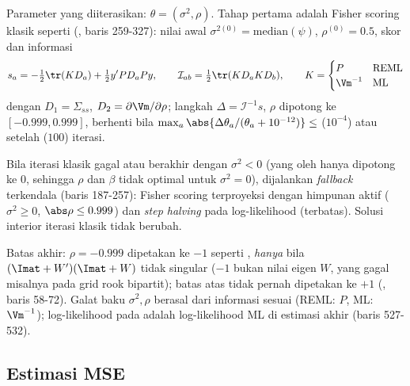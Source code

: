 Parameter yang diiterasikan: $\theta=(\sigma^2,\rho)$. Tahap pertama adalah
Fisher scoring klasik seperti  (,
baris 259-327): nilai awal $\sigma^{2(0)}=\mathrm{median}(\psi)$,
$\rho^{(0)}=0.5$, skor dan informasi
\begin{equation}
  s_a=-\tfrac12\tr(K D_a)+\tfrac12 y'P D_a P y,
  \qquad
  \mathcal I_{ab}=\tfrac12\tr(K D_a K D_b),
  \qquad K=\begin{cases}P&\text{REML}\\ \Vm^{-1}&\text{ML}\end{cases}
  \label{eq:sfh-score-reml}
\end{equation}
dengan $D_1=\Sigma_{ss}$, $D_2=\partial\Vm/\partial\rho$; langkah
$\Delta=\mathcal I^{-1}s$, $\rho$ dipotong ke $[-0.999,0.999]$, berhenti bila
$\max_a\abs{\Delta\theta_a/(\theta_a+10^{-12})}\le$ 
($10^{-4}$) atau setelah  ($100$) iterasi.

Bila iterasi klasik gagal atau berakhir dengan $\sigma^2<0$ (yang oleh
 hanya dipotong ke $0$, sehingga $\rho$ dan $\beta$ tidak optimal
untuk $\sigma^2=0$), dijalankan \emph{fallback} terkendala
 (baris 187-257): Fisher scoring terproyeksi
dengan himpunan aktif ($\sigma^2\ge0$, $\abs\rho\le0.999$) dan \emph{step
halving} pada log-likelihood (terbatas). Solusi interior iterasi klasik tidak
berubah.

Batas akhir: $\rho=-0.999$ dipetakan ke $-1$ seperti , \emph{hanya}
bila $(\Imat+W')(\Imat+W)$ tidak singular ($-1$ bukan nilai eigen $W$, yang
gagal misalnya pada grid rook bipartit); batas atas tidak pernah dipetakan ke
$+1$ (, baris 58-72). Galat baku $\sigma^2,\rho$ berasal
dari informasi sesuai  (REML: $P$, ML: $\Vm^{-1}$); log-likelihood
pada  adalah log-likelihood ML di estimasi akhir
(baris 527-532).

\subsection{Estimasi MSE}\label{sec:sfh-mse}

